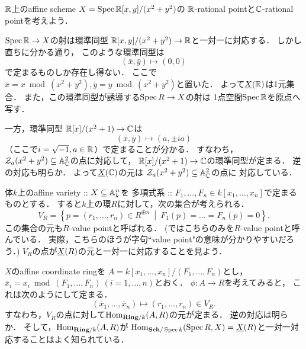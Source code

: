 \documentclass[a4paper]{jsarticle}
\begin{document}
    \begin{Example}
        $\mathbb{R}$上のaffine scheme $X=\operatorname{Spec} \mathbb{R}[x,y]/(x^2+y^2)$の
        $\mathbb{R}$-rational pointと$\mathbb{C}$-rational pointを考えよう．

        $\operatorname{Spec} \mathbb{R} \to X$の射は環準同型 $\mathbb{R}[x,y]/(x^2+y^2) \to \mathbb{R}$と一対一に対応する．
        しかし直ちに分かる通り，
        このような環準同型は
        \[ (\bar{x}, \bar{y}) \mapsto (0, 0) \]
        で定まるものしか存在し得ない．
        ここで$\bar{x}=x \bmod (x^2+y^2), \bar{y}=y \bmod (x^2+y^2)$と置いた．
        よって$\underline{X}(\mathbb{R})$は1元集合．
        また，この環準同型が誘導する$\operatorname{Spec} R \to X$の射は
        1点空間$\operatorname{Spec} \mathbb{R}$を原点へ写す．

        一方，環準同型 $\mathbb{R}[x]/(x^2+1) \to \mathbb{C}$は
        \[ (\bar{x}, \bar{y}) \mapsto (a, \pm ia) \]
        （ここで$i=\sqrt{-1}, a \in \mathbb{R}$）で定まることが分かる．
        すなわち，$\mathcal{Z}_a(x^2+y^2) \subseteq \mathbb{A}^2_{\mathbb{C}}$の点に対応して，
        $\mathbb{R}[x]/(x^2+1) \to \mathbb{C}$の環準同型が定まる．
        逆の対応も明らか．
        よって$\underline{X}(\mathbb{C})$の元は
        $\mathcal{Z}_a(x^2+y^2) \subseteq \mathbb{A}^2_{\mathbb{C}}$の点に
        対応している．
    \end{Example}

    \begin{Example}
        体$k$上のaffine variety :: 
        $X \subseteq \mathbb{A}^n_k$を
        多項式系 :: $F_1,\dots,F_n \in k[x_1,\dots,x_n]$で定まるものとする．
        すると$k$上の環$R$に対して，次の集合が考えられる．
        \[ V_R=\left\{ p=(r_1,\dots,r_n) \in R^{\oplus n} ~\middle|~ F_1(p)=\dots=F_n(p)=0 \right\}. \]
        この集合の元も$R$-value pointと呼ばれる．
        (\cite{Muk1}ではこちらのみを$R$-value pointと呼んでいる．
        実際，こちらのほうが字句``value point"の意味が分かりやすいだろう．)
        $V_R$の点が$\underline{X}(R)$の元と一対一に対応することを見よう．

        $X$のaffine coordinate ringを
        $A=k[x_1,\dots,x_n]/(F_1,\dots,F_n)$とし，
        $\bar{x}_i=x_i \bmod (F_1,\dots,F_n) ~(i=1,\dots,n)$とおく．
        $\phi: A \to R$を考えてみると，
        これは次のようにして定まる．
        \[ (\bar{x}_1,\dots,\bar{x}_n) \mapsto (r_1,\dots,r_n) \in V_R. \]
        すなわち，$V_R$の点に対して$\operatorname{Hom}_{\mathbf{Ring}/k}(A,R)$の元が定まる．
        逆の対応は明らか．
        そして，$\operatorname{Hom}_{\mathbf{Ring}/k}(A,R)$が
        $\operatorname{Hom}_{\mathbf{Sch}/\operatorname{Spec} k}(\operatorname{Spec} R, X)=\underline{X}(R)$と一対一対応することはよく知られている．
    \end{Example}
\end{document}
